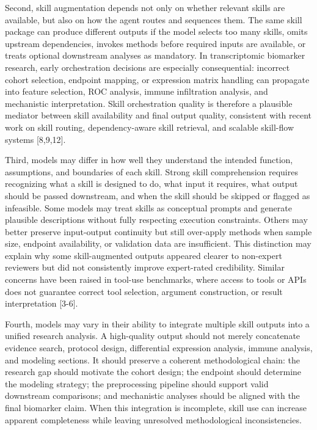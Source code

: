 \documentclass[11pt]{article}
\begin{document}
Second, skill augmentation depends not only on whether relevant skills are available, but also on how the agent routes and sequences them. The same skill package can produce different outputs if the model selects too many skills, omits upstream dependencies, invokes methods before required inputs are available, or treats optional downstream analyses as mandatory. In transcriptomic biomarker research, early orchestration decisions are especially consequential: incorrect cohort selection, endpoint mapping, or expression matrix handling can propagate into feature selection, ROC analysis, immune infiltration analysis, and mechanistic interpretation. Skill orchestration quality is therefore a plausible mediator between skill availability and final output quality, consistent with recent work on skill routing, dependency-aware skill retrieval, and scalable skill-flow systems [8,9,12].

Third, models may differ in how well they understand the intended function, assumptions, and boundaries of each skill. Strong skill comprehension requires recognizing what a skill is designed to do, what input it requires, what output should be passed downstream, and when the skill should be skipped or flagged as infeasible. Some models may treat skills as conceptual prompts and generate plausible descriptions without fully respecting execution constraints. Others may better preserve input-output continuity but still over-apply methods when sample size, endpoint availability, or validation data are insufficient. This distinction may explain why some skill-augmented outputs appeared clearer to non-expert reviewers but did not consistently improve expert-rated credibility. Similar concerns have been raised in tool-use benchmarks, where access to tools or APIs does not guarantee correct tool selection, argument construction, or result interpretation [3-6].

Fourth, models may vary in their ability to integrate multiple skill outputs into a unified research analysis. A high-quality output should not merely concatenate evidence search, protocol design, differential expression analysis, immune analysis, and modeling sections. It should preserve a coherent methodological chain: the research gap should motivate the cohort design; the endpoint should determine the modeling strategy; the preprocessing pipeline should support valid downstream comparisons; and mechanistic analyses should be aligned with the final biomarker claim. When this integration is incomplete, skill use can increase apparent completeness while leaving unresolved methodological inconsistencies.
\end{document}
